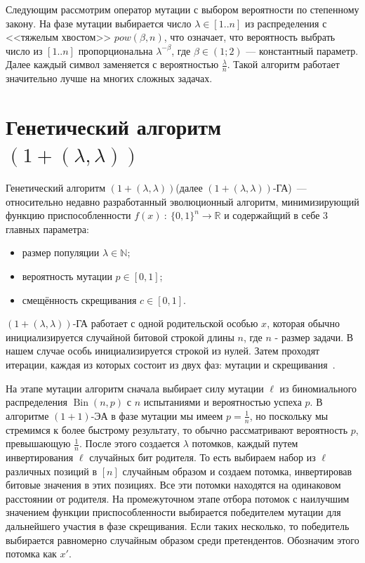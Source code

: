 \documentclass[times]{itmo-student-thesis}
\newcommand{\alglambda}{${(1 + (\lambda , \lambda))}$\xspace}
\newcommand{\alglambdaf}{${(1 + (\lambda , \lambda))}$-ГА\xspace}
\newcommand{\oea}{\mbox{$(1 + 1)$-ЭА}\xspace}
\newcommand{\N}{{\mathbb N}}
\newcommand{\R}{{\mathbb R}}
\DeclareMathOperator{\Bin}{Bin}
\begin{document}
Следующим рассмотрим оператор мутации с выбором вероятности по степенному закону. На фазе мутации выбирается число $\lambda \in [1..n]$ из распределения с <<тяжелым хвостом>> $pow(\beta, n)$, что означает, что  вероятность выбрать число из $[1..n]$ пропорциональна $\lambda^{-\beta}$, где $\beta \in (1; 2)$ --- константный параметр.
Далее каждый символ заменяется с вероятностью $\frac{\lambda}{n}$. Такой алгоритм работает значительно лучше на многих сложных задачах.

\section{Генетический алгоритм \alglambda}

Генетический алгоритм \alglambda(далее \alglambdaf)~--- относительно недавно разработанный эволюционный алгоритм, минимизирующий функцию приспособленности $f(x)~:~\{0, 1\}^n \rightarrow \R$ и содержайщий в себе 3 главных параметра:
\begin{itemize}
   \item размер популяции $\lambda \in \N$;
   \item вероятность мутации $p \in [0, 1]$;
   \item смещённость скрещивания $c \in [0, 1]$.
\end{itemize}
\alglambdaf работает с одной родительской особью $x$, которая обычно инициализируется случайной битовой строкой длины $n$, где $n$ - размер задачи. В нашем случае особь инициализируется строкой из нулей. Затем проходят итерации, каждая из которых состоит из двух фаз: мутации и скрещивания~\cite{DoerrDE15}.

На этапе мутации алгоритм сначала выбирает силу мутации $\ell$ из биномиального распределения $\Bin(n, p)$ с $n$ испытаниями и вероятностью успеха $p$. В алгоритме \oea в фазе мутации мы имеем $p = \frac{1}{n}$, но поскольку мы стремимся к более быстрому результату, то обычно рассматривают вероятность $p$, превышающую $\frac{1}{n}$.
После этого создается $\lambda$ потомков, каждый путем инвертирования $\ell$ случайных бит родителя. То есть выбираем набор из $\ell$ различных позиций в $[n]$ случайным образом и создаем потомка, инвертировав битовые значения в этих позициях.
Все эти потомки находятся на одинаковом расстоянии от родителя.
На промежуточном этапе отбора потомок с наилучшим значением функции приспособленности выбирается победителем мутации для дальнейшего участия в фазе скрещивания. Если таких несколько, то победитель выбирается равномерно случайным образом среди претендентов.
Обозначим этого потомка как $x'$.
\end{document}
